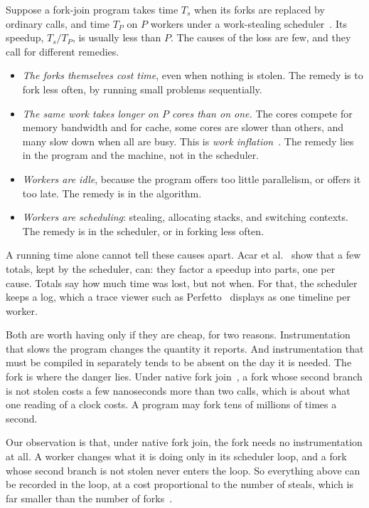 \documentclass[sigplan,nonacm]{acmart}
\begin{document}
Suppose a fork-join program takes time $T_s$ when its forks are
replaced by ordinary calls, and time $T_P$ on $P$ workers under a
work-stealing scheduler~\cite{blumofele99}.
%
Its speedup, $T_s/T_P$, is usually less than $P$.
%
The causes of the loss are few, and they call for different remedies.
%
\begin{itemize}[leftmargin=*]
\item \emph{The forks themselves cost time}, even when nothing is
  stolen.
  The remedy is to fork less often, by running small problems
  sequentially.
\item \emph{The same work takes longer on $P$ cores than on one.}
  The cores compete for memory bandwidth and for cache, some cores are
  slower than others, and many slow down when all are busy.
  This is \emph{work inflation}~\cite{acar2017inflation}.
  The remedy lies in the program and the machine, not in the
  scheduler.
\item \emph{Workers are idle}, because the program offers too little
  parallelism, or offers it too late.
  The remedy is in the algorithm.
\item \emph{Workers are scheduling}: stealing, allocating stacks, and
  switching contexts.
  The remedy is in the scheduler, or in forking less often.
\end{itemize}
%
A running time alone cannot tell these causes apart.
%
Acar et al.~\cite{acar2017inflation} show that a few totals, kept by
the scheduler, can: they factor a speedup into parts, one per cause.
%
Totals say how much time was lost, but not when.
%
For that, the scheduler keeps a log, which a trace viewer such as
Perfetto~\cite{perfetto} displays as one timeline per worker.

Both are worth having only if they are cheap, for two reasons.
%
Instrumentation that slows the program changes the quantity it
reports.
%
And instrumentation that must be compiled in separately tends to be
absent on the day it is needed.
%
The fork is where the danger lies.
%
Under native fork join~\cite{nativeforkjoin}, a fork whose second
branch is not stolen costs a few nanoseconds more than two calls,
which is about what one reading of a clock costs.
%
A program may fork tens of millions of times a second.

Our observation is that, under native fork join, the fork needs no
instrumentation at all.
%
A worker changes what it is doing only in its scheduler loop, and a
fork whose second branch is not stolen never enters the loop.
%
So everything above can be recorded in the loop, at a cost
proportional to the number of steals, which is far smaller than the
number of forks~\cite{blumofele99,arora98}.
\end{document}

